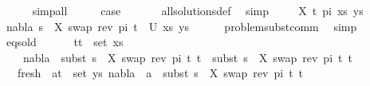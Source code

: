 \begin{isabellebody}
\ \ \ \ \isamarkupfalse%
\ simp{\isacharunderscore}{\kern0pt}all\isanewline
\ \ \isamarkupfalse%
\ \isamarkupfalse%
\ {\isacharquery}{\kern0pt}case\ \isanewline
\ \ \ \ \isamarkupfalse%
\ all{\isacharunderscore}{\kern0pt}solutions{\isacharunderscore}{\kern0pt}def\ \isamarkupfalse%
\ simp\isanewline
{}\isamarkupfalse%
\isanewline
\ \ \isamarkupfalse%
\ {\isacharparenleft}{\kern0pt}{}\ X\ t{\isacharprime}{\kern0pt}\ pi\ xs\ ys{\isacharparenright}{\kern0pt}\isanewline
\ \ \isamarkupfalse%
\ {\isachardoublequoteopen}{\isacharparenleft}{\kern0pt}nabla{}{\isacharcomma}{\kern0pt}\ s{}\ {\isasymbullet}\ {\isacharbrackleft}{\kern0pt}{\isacharparenleft}{\kern0pt}X{\isacharcomma}{\kern0pt}\ swap\ {\isacharparenleft}{\kern0pt}rev\ pi{\isacharparenright}{\kern0pt}\ t{\isacharprime}{\kern0pt}{\isacharparenright}{\kern0pt}{\isacharbrackright}{\kern0pt}{\isacharparenright}{\kern0pt}\ {\isasymin}\ U\ {\isacharparenleft}{\kern0pt}xs{\isacharcomma}{\kern0pt}\ ys{\isacharparenright}{\kern0pt}{\isachardoublequoteclose}\isanewline
\ \ \ \ \isamarkupfalse%
\ problem{\isacharunderscore}{\kern0pt}subst{\isacharunderscore}{\kern0pt}comm\ \isamarkupfalse%
\ simp\isanewline
\ \ \isamarkupfalse%
\ eqs{\isacharunderscore}{\kern0pt}old{\isacharcolon}{\kern0pt}\ \isanewline
\ \ \ \ {\isachardoublequoteopen}{\isasymforall}\ {\isacharparenleft}{\kern0pt}t{}{\isacharcomma}{\kern0pt}t{}{\isacharparenright}{\kern0pt}\ {\isasymin}\ set\ xs{\isachardot}{\kern0pt}\ \isanewline
\ \ \ \ nabla{}\ {\isasymturnstile}\ subst\ {\isacharparenleft}{\kern0pt}s{}\ {\isasymbullet}\ {\isacharbrackleft}{\kern0pt}{\isacharparenleft}{\kern0pt}X{\isacharcomma}{\kern0pt}\ swap\ {\isacharparenleft}{\kern0pt}rev\ pi{\isacharparenright}{\kern0pt}\ t{\isacharprime}{\kern0pt}{\isacharparenright}{\kern0pt}{\isacharbrackright}{\kern0pt}{\isacharparenright}{\kern0pt}\ t{}\ {\isasymapprox}\ subst\ {\isacharparenleft}{\kern0pt}s{}\ {\isasymbullet}\ {\isacharbrackleft}{\kern0pt}{\isacharparenleft}{\kern0pt}X{\isacharcomma}{\kern0pt}\ swap\ {\isacharparenleft}{\kern0pt}rev\ pi{\isacharparenright}{\kern0pt}\ t{\isacharprime}{\kern0pt}{\isacharparenright}{\kern0pt}{\isacharbrackright}{\kern0pt}{\isacharparenright}{\kern0pt}\ t{}{\isachardoublequoteclose}\isanewline
\ \ \ fresh{\isacharcolon}{\kern0pt}\ {\isachardoublequoteopen}{\isasymforall}\ {\isacharparenleft}{\kern0pt}a{\isacharcomma}{\kern0pt}t{\isacharparenright}{\kern0pt}\ {\isasymin}\ set\ ys{\isachardot}{\kern0pt}\ nabla{}\ {\isasymturnstile}\ a\ {\isasymsharp}\ subst\ {\isacharparenleft}{\kern0pt}s{}\ {\isasymbullet}\ {\isacharbrackleft}{\kern0pt}{\isacharparenleft}{\kern0pt}X{\isacharcomma}{\kern0pt}\ swap\ {\isacharparenleft}{\kern0pt}rev\ pi{\isacharparenright}{\kern0pt}\ t{\isacharprime}{\kern0pt}{\isacharparenright}{\kern0pt}{\isacharbrackright}{\kern0pt}{\isacharparenright}{\kern0pt}\ t{\isachardoublequoteclose}\isanewline

\end{isabellebody}

